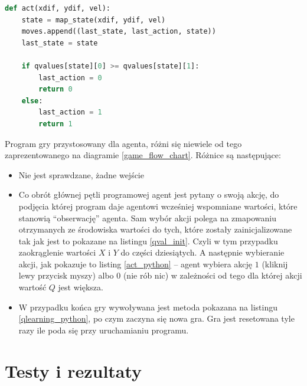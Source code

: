 \documentclass[a4paper, 12pt,oneside]{book}
\begin{document}
\begin{lstlisting}[language=Python, label={act_python},
caption={Metoda wybierająca akcję agenta}, captionpos=t]
def act(xdif, ydif, vel):
    state = map_state(xdif, ydif, vel)
    moves.append((last_state, last_action, state))
    last_state = state

    if qvalues[state][0] >= qvalues[state][1]:
        last_action = 0
        return 0
    else:
        last_action = 1
        return 1
\end{lstlisting}
Program gry przystosowany dla agenta, różni się niewiele od tego
zaprezentowanego na diagramie \ref{game_flow_chart}. Różnice są następujące:
\begin{itemize}
\setlength\itemsep{-0.4em}
\item Nie jest sprawdzane, żadne wejście
\item Co obrót głównej pętli programowej agent jest pytany o swoją akcję, do
	podjęcia której program daje agentowi wcześniej wspomniane wartości,
	które stanowią ``obserwację'' agenta. Sam wybór akcji polega na
	zmapowaniu otrzymanych ze środowiska wartości do tych, które zostały
	zainicjalizowane tak jak jest to pokazane na listingu \ref{qval_init}.
	Czyli w tym przypadku zaokrąglenie wartości $X$ i $Y$ do części
	dziesiątych. A następnie wybieranie akcji, jak pokazuje to
	listing \ref{act_python} -- agent wybiera akcję $1$ (kliknij lewy
	przycisk myszy) albo $0$ (nie rób nic) w zależności od tego dla której
	akcji wartość $Q$ jest większa.
\item W przypadku końca gry wywoływana jest metoda pokazana na listingu
	\ref{qlearning_python},  po czym zaczyna się nowa gra. Gra jest
	resetowana tyle razy ile poda się przy uruchamianiu programu.
\end{itemize}

\chapter{Testy i rezultaty}
\label{chapter:testy}
\end{document}
